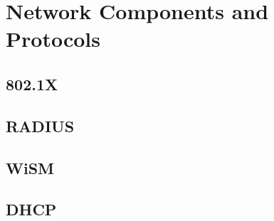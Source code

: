 
\chapter{Network Components and Protocols} %

\label{Chapter3} %



\section{802.1X}



\section{RADIUS}


\section{WiSM}



\section{DHCP}



